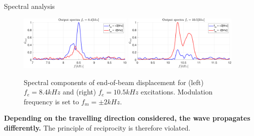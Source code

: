 \begin{frame}{Spectral analysis}

    \begin{figure}[H]
        \centering
        \includegraphics[width=0.49\textwidth]{img/MATLAB/Spectra_narrow8p4kHz_2000.pdf}
        \hfill
        \includegraphics[width=0.49\textwidth]{img/MATLAB/Spectra_narrow10p5kHz_2000.pdf}
        \caption{Spectral components of end-of-beam displacement for (left) $f_e = 8.4 kHz$ and (right) $f_e = 10.5 kHz$ excitations. Modulation frequency is set to $f_m = \pm 2 kHz$.}
    \end{figure}

    \textbf{Depending on the travelling direction considered, the wave propagates differently.}
    The principle of reciprocity is therefore violated.

\end{frame}